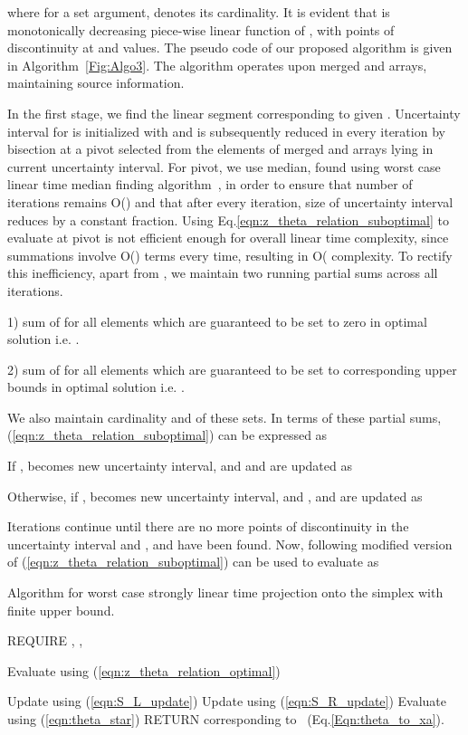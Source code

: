\documentclass{article}
\begin{document}
where  for a set argument, denotes its cardinality. It is evident that  is monotonically decreasing piece-wise linear function of , with  points of discontinuity at  and  values.
The pseudo code of our proposed algorithm is given in Algorithm~\ref{Fig:Algo3}.
The algorithm operates upon merged  and  arrays, maintaining source information.


In the first stage, we find the linear segment corresponding to given . Uncertainty interval  for  is initialized with   and is subsequently reduced in every iteration by bisection at a pivot selected from the elements of merged  and  arrays lying in current uncertainty interval.  For pivot, we use median, found using worst case linear time median finding algorithm~\cite{CLR01}, in order to ensure that number of iterations remains O() and that after every iteration, size of uncertainty interval reduces by a constant fraction. Using Eq.\eqref{eqn:z_theta_relation_suboptimal} to evaluate  at pivot  is not efficient enough for overall linear time complexity, since summations involve O() terms every time, resulting in O( complexity. To rectify this inefficiency, apart from , we maintain two running partial sums across all iterations.

1)  sum of  for all elements which are guaranteed to be set to zero in optimal solution i.e. .

2)  sum of  for all elements which are guaranteed to be set to corresponding upper bounds in optimal solution i.e. .

We also maintain cardinality   and  of these sets. In terms of these partial sums, (\ref{eqn:z_theta_relation_suboptimal}) can be expressed as

If ,   becomes new uncertainty interval, and  and  are updated as

Otherwise, if ,  becomes new uncertainty interval, and , and  are updated as

Iterations continue until there are no more points of discontinuity in the uncertainty interval and ,  and  have been found. Now, following modified version of (\ref{eqn:z_theta_relation_suboptimal}) can be used to evaluate  as


\begin{algorithm}
\caption{Algorithm for worst case strongly linear time projection onto the simplex with finite upper bound.}
\label{Fig:Algo3}
\begin{algorithmic}\STATE REQUIRE ,  , 
\STATE  {}
\STATE 
\STATE 
\STATE 
\STATE 

\WHILE{ }

\STATE 
\STATE 
\STATE 

\STATE Evaluate  using (\ref{eqn:z_theta_relation_optimal})

\IF{ }
\STATE 
\STATE Update  using (\ref{eqn:S_L_update})
\ELSE
\STATE 
\STATE Update  using (\ref{eqn:S_R_update})
\ENDIF
\ENDWHILE
\STATE Evaluate  using (\ref{eqn:theta_star})
\STATE RETURN  corresponding to ~(Eq.\ref{Eqn:theta_to_xa}).
\end{algorithmic}
\end{algorithm}
\end{document}
